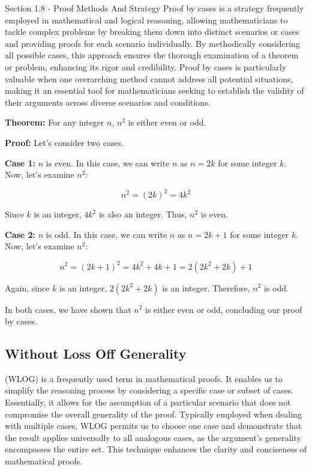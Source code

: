 \begin{notes}{Section 1.8 - Proof Methods And Strategy}
    Proof by cases is a strategy frequently employed in mathematical and logical reasoning, allowing mathematicians to tackle complex problems by breaking them down into distinct scenarios or cases and providing 
    proofs for each scenario individually. By methodically considering all possible cases, this approach ensures the thorough examination of a theorem or problem, enhancing its rigor and credibility. Proof by 
    cases is particularly valuable when one overarching method cannot address all potential situations, making it an essential tool for mathematicians seeking to establish the validity of their arguments across 
    diverse scenarios and conditions.

    \begin{highlight}
        \textbf{Theorem:} For any integer \(n\), \(n^2\) is either even or odd.
    
    
        \textbf{Proof:} Let's consider two cases. \vspace*{1em}
    
        \textbf{Case 1:} \(n\) is even. In this case, we can write \(n\) as \(n = 2k\) for some integer \(k\). Now, let's examine \(n^2\):
        
        \[n^2 = (2k)^2 = 4k^2\]
        
        Since \(k\) is an integer, \(4k^2\) is also an integer. Thus, \(n^2\) is even.
    
        \textbf{Case 2:} \(n\) is odd. In this case, we can write \(n\) as \(n = 2k + 1\) for some integer \(k\). Now, let's examine \(n^2\):
        
        \[n^2 = (2k + 1)^2 = 4k^2 + 4k + 1 = 2(2k^2 + 2k) + 1\]
        
        Again, since \(k\) is an integer, \(2(2k^2 + 2k)\) is an integer. Therefore, \(n^2\) is odd.
    
    
        In both cases, we have shown that \(n^2\) is either even or odd, concluding our proof by cases.
    \end{highlight}
    
    \subsection*{Without Loss Off Generality}

    (WLOG) is a frequently used term in mathematical proofs. It enables us to simplify the reasoning process by considering a specific case or subset of cases. Essentially, it allows for the assumption of a particular 
    scenario that does not compromise the overall generality of the proof. Typically employed when dealing with multiple cases, WLOG permits us to choose one case and demonstrate that the result applies universally to 
    all analogous cases, as the argument's generality encompasses the entire set. This technique enhances the clarity and conciseness of mathematical proofs.


\end{notes}

